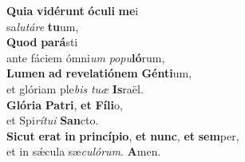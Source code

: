 \evenverse \textbf{Qui}\textbf{a} \textbf{vi}\textbf{dé}\textbf{runt} \textbf{ó}\textbf{cu}\textbf{li} \textbf{me}i~\*\\
\evenverse sa\textit{lu}\textit{tá}\textit{re} \textbf{tu}um,\\
\oddverse \textbf{Quod} \textbf{pa}\textbf{rá}sti~\*\\
\oddverse ante fáciem ómni\textit{um} \textit{po}\textit{pu}\textbf{ló}rum,\\
\evenverse \textbf{Lu}\textbf{men} \textbf{ad} \textbf{re}\textbf{ve}\textbf{la}\textbf{ti}\textbf{ó}\textbf{nem} \textbf{Gén}\textbf{ti}um,~\*\\
\evenverse et glóriam ple\textit{bis} \textit{tu}\textit{æ} \textbf{Is}raël.\\
\oddverse \textbf{Gló}\textbf{ri}\textbf{a} \textbf{Pa}\textbf{tri}, \textbf{et} \textbf{Fí}\textbf{li}o,~\*\\
\oddverse et Spi\textit{rí}\textit{tu}\textit{i} \textbf{San}cto.\\
\evenverse \textbf{Si}\textbf{cut} \textbf{e}\textbf{rat} \textbf{in} \textbf{prin}\textbf{cí}\textbf{pi}\textbf{o}, \textbf{et} \textbf{nunc}, \textbf{et} \textbf{sem}per,~\*\\
\evenverse et in sǽcula sæ\textit{cu}\textit{ló}\textit{rum}. \textbf{A}men.\\
